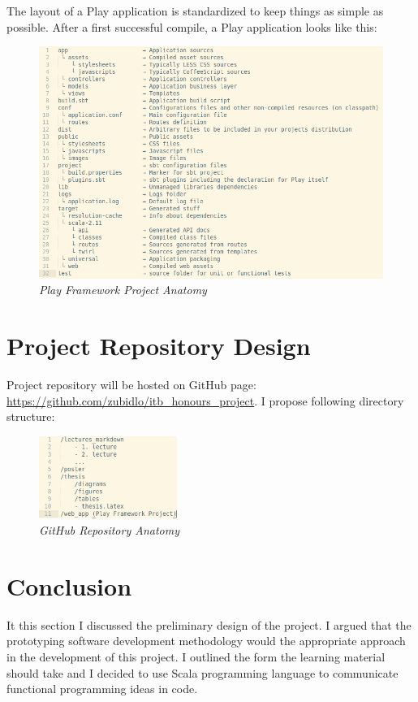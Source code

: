 \documentclass[12pt,twoside,a4paper]{report}
\begin{document}
The layout of a Play application is standardized to keep things as simple as possible. After a first successful compile, a Play application looks like this:

\begin{figure}[!ht]
	\centering
		\includegraphics[width=1\textwidth, totalheight=10cm]
		{play_framework_project_anatomy}
	\caption{\textit{Play Framework Project Anatomy}}
	\label{f3.9.1}
\end{figure}

\section{Project Repository Design}\label{3.10}
Project repository will be hosted on GitHub page: \url{https://github.com/zubidlo/itb_honours_project}.
I propose following directory structure:

\begin{figure}[!ht]
	\centering
		\includegraphics[width=0.4\textwidth, totalheight=4cm]
		{github_repo_anatomy}
	\caption{\textit{GitHub Repository Anatomy}}
	\label{f3.10}
\end{figure}


\section{Conclusion}\label{3.11}
It this section I discussed the preliminary design of the project. I argued that the prototyping software development methodology would the appropriate approach in the development of this project. I outlined the form the learning material should take and I decided to use Scala programming language to communicate functional programming ideas in code.
\end{document}
